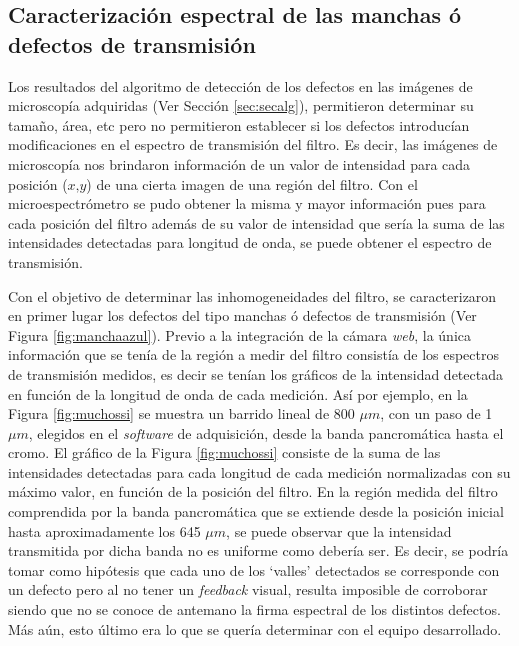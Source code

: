 
\singlespacing
\subsection{Caracterización espectral de las manchas ó defectos de transmisión}
\label{sec:defctma}

\hspace{0.5cm}Los resultados del algoritmo de detección de los defectos en las imágenes de microscopía adquiridas (Ver Sección \ref{sec:secalg}), permitieron determinar su tamaño, área, etc pero no permitieron establecer si los defectos introducían modificaciones en el espectro de transmisión del filtro. Es decir, las imágenes de microscopía nos brindaron información de un valor de intensidad para cada posición ($\textit{x,y}$) de una cierta imagen de una región del filtro. Con el microespectrómetro se pudo obtener la misma y mayor información pues para cada posición del filtro además de su valor de intensidad que sería la suma de las intensidades detectadas para longitud de onda, se puede obtener el espectro de transmisión.

Con el objetivo de determinar las inhomogeneidades del filtro, se caracterizaron en primer lugar los defectos del tipo manchas ó defectos de transmisión (Ver Figura \ref{fig:manchaazul}). Previo a la integración de la cámara \textit{web}, la única información que se tenía de la región a medir del filtro consistía de los espectros de transmisión medidos, es decir se tenían los gráficos de la intensidad detectada en función de la longitud de onda de cada medición. Así por ejemplo, en la Figura \ref{fig:muchossi} se muestra un barrido lineal de  800 $\mu m$, con un paso de 1 $\mu m$, elegidos en el \textit{software} de adquisición, desde la banda pancromática hasta el cromo. El gráfico de la Figura \ref{fig:muchossi} consiste de la suma de las intensidades detectadas para cada longitud de cada medición normalizadas con su máximo valor, en función de la posición del filtro. En la región medida del filtro comprendida por la banda pancromática que se extiende desde la posición inicial hasta aproximadamente los 645 $\mu m$, se puede observar que la intensidad transmitida por dicha banda no es uniforme como debería ser. Es decir, se podría tomar como hipótesis que cada uno de los `valles' detectados se corresponde con un defecto pero al no tener un \textit{feedback} visual, resulta imposible de corroborar siendo que no se conoce de antemano la firma espectral de los distintos defectos. Más aún, esto último era lo que se quería determinar con el equipo desarrollado.  

